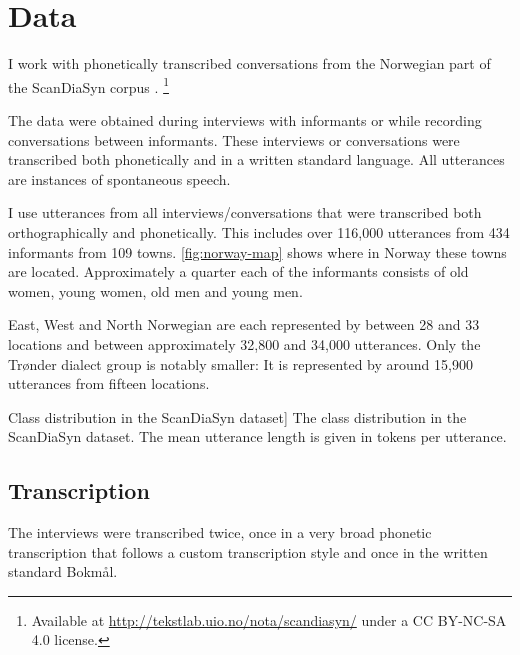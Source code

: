 \section{Data}
\label{sec:dialects-data}

I work with phonetically transcribed conversations from the Norwegian part of the ScanDiaSyn corpus \citep{johannessen2009nordic}.%
\footnote{Available at \url{http://tekstlab.uio.no/nota/scandiasyn/} under a CC BY-NC-SA 4.0 license.}

The data were obtained during interviews with informants or while recording conversations between informants.
These interviews or conversations were transcribed both phonetically and in a written standard language.
All utterances are instances of spontaneous speech.


I use utterances from all interviews/conversations that were transcribed both orthographically and phonetically.
This includes over 116,000 utterances from 434 informants from 109 towns.
\autoref{fig:norway-map} shows where in Norway these towns are located.
Approximately a quarter each of the informants consists of old women, young women, old men and young men. 

East, West and North Norwegian are each represented by between 28 and 33 locations and between approximately 32,800 and 34,000 utterances.
Only the Trønder dialect group is notably smaller: It is represented by around 15,900 utterances from fifteen locations.

\begin{table}[ht]

\caption
[Class distribution in the ScanDiaSyn dataset]
{The class distribution in the ScanDiaSyn dataset.
The mean utterance length is given in tokens per utterance.}
\label{tab:scandiasyn}
\end{table}


\subsection{Transcription}

The interviews were transcribed twice, once in a very broad phonetic transcription that follows a  custom transcription style and once in the written standard Bokm{\aa}l.



